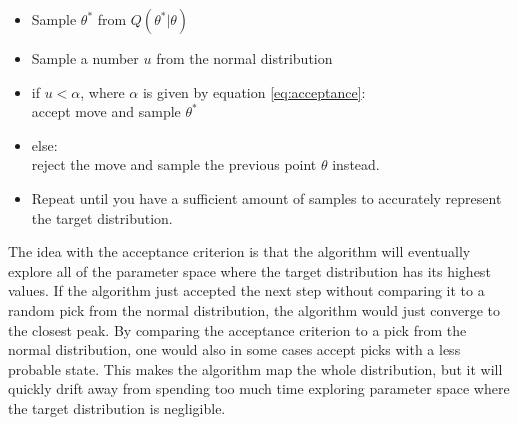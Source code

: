 \begin{itemize}
    \item Sample $\theta^*$ from $Q(\theta^*\vert\theta)$ \\
    \item Sample a number $u$ from the normal distribution \\
    \item if $u < \alpha$, where  $\alpha$ is given by equation \ref{eq:acceptance}: \\
          \indent accept move and sample $\theta^*$\\
    \item else:\\
          \indent reject the move and sample the previous point $\theta$ instead.\\
    \item Repeat until you have a sufficient amount of samples to accurately represent the
    target distribution.
\end{itemize}
The idea with the acceptance criterion is that the algorithm will eventually
explore all of the parameter space where the target distribution has its highest values. If the algorithm just
accepted the next step without comparing it to a random pick from the normal
distribution, the algorithm would just converge to the closest peak. By
comparing the acceptance criterion to a pick from the normal distribution, one
would also in some cases accept picks with a less probable state. This makes the
algorithm map the whole distribution, but it will quickly drift away from
spending too much time exploring parameter space where the target distribution is negligible. 
